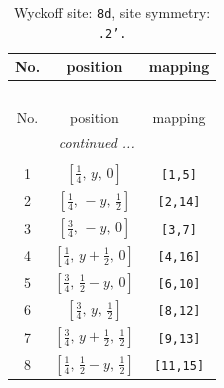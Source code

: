 \documentclass[fleqn,8pt]{jsarticle}
\begin{document}
\begin{longtable}{ccc}
\caption{Wyckoff site: {\tt 8d}, site symmetry: {\tt .2'.}}
 \\
 \hline \hline
No. & position & mapping \\ \hline \endfirsthead

\multicolumn{2}{l}{\tablename\ \thetable{}} \\
 \hline \hline
No. & position & mapping \\ \hline \endhead

 \hline \hline
\multicolumn{2}{r}{\footnotesize\it continued ...} \\ \endfoot

 \hline \hline
\multicolumn{2}{r}{} \\ \endlastfoot

1 & $\left[ \frac{1}{4},\, y,\, 0 \right]$ & {\tt [1,5]} \\ \hline
2 & $\left[ \frac{1}{4},\, - y,\, \frac{1}{2} \right]$ & {\tt [2,14]} \\ \hline
3 & $\left[ \frac{3}{4},\, - y,\, 0 \right]$ & {\tt [3,7]} \\ \hline
4 & $\left[ \frac{1}{4},\, y + \frac{1}{2},\, 0 \right]$ & {\tt [4,16]} \\ \hline
5 & $\left[ \frac{3}{4},\, \frac{1}{2} - y,\, 0 \right]$ & {\tt [6,10]} \\ \hline
6 & $\left[ \frac{3}{4},\, y,\, \frac{1}{2} \right]$ & {\tt [8,12]} \\ \hline
7 & $\left[ \frac{3}{4},\, y + \frac{1}{2},\, \frac{1}{2} \right]$ & {\tt [9,13]} \\ \hline
8 & $\left[ \frac{1}{4},\, \frac{1}{2} - y,\, \frac{1}{2} \right]$ & {\tt [11,15]} \\
\end{longtable}
\renewcommand{\arraystretch}{1.2}
\end{document}
